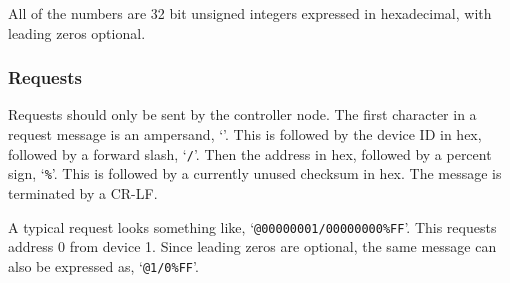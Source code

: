 \documentclass[10pt, openany, draft]{article}
\begin{document}
All of the numbers are 32 bit unsigned integers expressed in hexadecimal, with leading zeros optional.  

\subsubsection{Requests}
Requests should only be sent by the controller node.  The first character in a request message is an ampersand, `\texttt{\@}'.  This is followed by the device ID in hex, followed by a forward slash, `\texttt{/}'.  Then the address in hex, followed by a percent sign, `\texttt{\%}'.  This is followed by a currently unused checksum in hex.  The message is terminated by a CR-LF.

A typical request looks something like, `\texttt{@00000001/00000000\%FF}'.  This requests address 0 from device 1.  Since leading zeros are optional, the same message can also be expressed as, `\texttt{@1/0\%FF}'.
\end{document}
